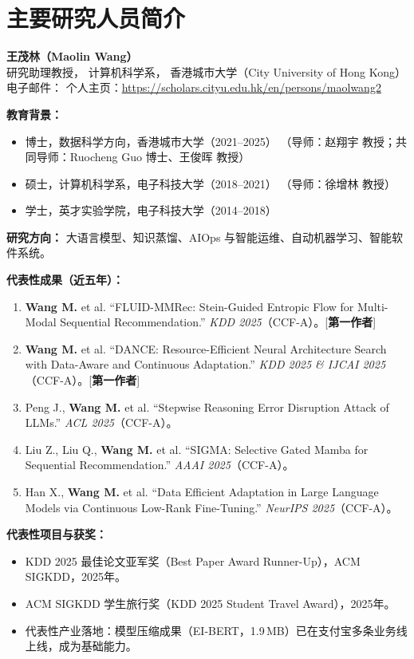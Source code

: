 \documentclass[lang=cn,a4paper,newtx,bibend=bibtex]{elegantpaper}
\begin{document}
\section{主要研究人员简介}

\textbf{王茂林（Maolin Wang）}\\
研究助理教授，
计算机科学系，
香港城市大学（City University of Hong Kong）\\
电子邮件： \quad
个人主页：\url{https://scholars.cityu.edu.hk/en/persons/maolwang2}

\textbf{教育背景：}
\begin{itemize}[leftmargin=*, itemsep=1pt]
  \item 博士，数据科学方向，香港城市大学（2021--2025）
        （导师：赵翔宇 教授；共同导师：Ruocheng Guo 博士、王俊晖 教授）
  \item 硕士，计算机科学系，电子科技大学（2018--2021）
        （导师：徐增林 教授）
  \item 学士，英才实验学院，电子科技大学（2014--2018）
\end{itemize}

\textbf{研究方向：}
大语言模型、知识蒸馏、AIOps 与智能运维、自动机器学习、智能软件系统。

\textbf{代表性成果（近五年）：}
\begin{enumerate}[leftmargin=*, itemsep=2pt]
  \item \textbf{Wang M.} et al.
        ``FLUID-MMRec: Stein-Guided Entropic Flow for Multi-Modal Sequential Recommendation.''
        \textit{KDD 2025}（CCF-A）。[\textbf{第一作者}]
  \item \textbf{Wang M.} et al.
        ``DANCE: Resource-Efficient Neural Architecture Search with Data-Aware and Continuous Adaptation.''
        \textit{KDD 2025 \& IJCAI 2025}（CCF-A）。[\textbf{第一作者}]
  \item Peng J., \textbf{Wang M.} et al.
        ``Stepwise Reasoning Error Disruption Attack of LLMs.''
        \textit{ACL 2025}（CCF-A）。
  \item Liu Z., Liu Q., \textbf{Wang M.} et al.
        ``SIGMA: Selective Gated Mamba for Sequential Recommendation.''
        \textit{AAAI 2025}（CCF-A）。
  \item Han X., \textbf{Wang M.} et al.
        ``Data Efficient Adaptation in Large Language Models via Continuous Low-Rank Fine-Tuning.''
        \textit{NeurIPS 2025}（CCF-A）。
\end{enumerate}

\textbf{代表性项目与获奖：}
\begin{itemize}[leftmargin=*, itemsep=2pt]
  \item KDD 2025 最佳论文亚军奖（Best Paper Award Runner-Up），ACM SIGKDD，2025年。
  \item ACM SIGKDD 学生旅行奖（KDD 2025 Student Travel Award），2025年。
  \item 代表性产业落地：模型压缩成果（EI-BERT，1.9\,MB）已在支付宝多条业务线上线，成为基础能力。
\end{itemize}
\end{document}
